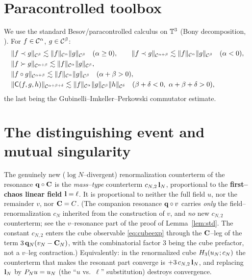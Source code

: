 \section*{Paracontrolled toolbox}

We use the standard Besov/paracontrolled calculus on $\mathbb{T}^3$ (Bony decomposition,
\cite{BCD11,GIP15}). For $f\in\mathcal{C}^\alpha$, $g\in\mathcal{C}^\beta$:
\begin{align}
&\|f\prec g\|_{\qoneC^{\beta}}\lesssim\|f\|_{\qoneC^{\alpha}}\|g\|_{\qoneC^{\beta}}\quad(\alpha\ge 0),\qquad
\|f\prec g\|_{\qoneC^{\alpha+\beta}}\lesssim\|f\|_{\qoneC^{\alpha}}\|g\|_{\qoneC^{\beta}}\quad(\alpha<0),\label{eq:para1}\\
&\|f\succ g\|_{\qoneC^{\alpha+\beta}}\lesssim\|f\|_{\qoneC^{\alpha}}\|g\|_{\qoneC^{\beta}},\label{eq:para2}\\
&\|f\circ g\|_{\qoneC^{\alpha+\beta}}\lesssim\|f\|_{\qoneC^{\alpha}}\|g\|_{\qoneC^{\beta}}\quad(\alpha+\beta>0),\label{eq:res}\\
&\|\mathsf C(f,g,h)\|_{\qoneC^{\alpha+\beta+\delta}}\lesssim\|f\|_{\qoneC^{\alpha}}\|g\|_{\qoneC^{\beta}}\|h\|_{\qoneC^{\delta}}\quad(\beta+\delta<0,\ \alpha+\beta+\delta>0),\label{eq:comm}
\end{align}
the last being the Gubinelli--Imkeller--Perkowski commutator estimate.

\section*{The distinguishing event and mutual singularity}

\begin{qoneproposition}\label{prop:ctvar}
The genuinely new ($\log N$--divergent) renormalization counterterm of the resonance
$\mathbf{q}\circ\mathbf{C}$ is the \emph{mass--type} counterterm $c_{N,2}\,\mathbf{l}_N$,
proportional to the \textbf{first--chaos linear field} $\mathbf{l}=\ell$. It is
proportional to neither the full field $u$, nor the remainder $v$, nor
$\mathbf{C}=C$. (The companion resonance $\mathbf{q}\circ v$ carries \emph{only} the
field--renormalization $c_N$ inherited from the construction of $v$, and \emph{no}
new $c_{N,2}$ counterterm; see the $v$--resonance part of the proof of
Lemma~\ref{lem:std}. The constant $c_{N,2}$ enters the cube observable
\eqref{eq:cubeexp} through the $\mathbf{C}$--leg of the term
$3\,\mathbf{q}_N(v_N-\mathbf{C}_N)$, with the combinatorial factor $3$ being the cube
prefactor, not a $v$--leg contraction.) Equivalently: in the renormalized cube
$H_3(u_N;c_N)$ the counterterm that makes the resonant part converge is
$+3\,c_{N,2}\,\mathbf{l}_N$, and replacing $\mathbf{l}_N$ by $P_N u=u_N$ (the ``$u$
vs.\ $\ell$'' substitution) destroys convergence.
\end{qoneproposition}

